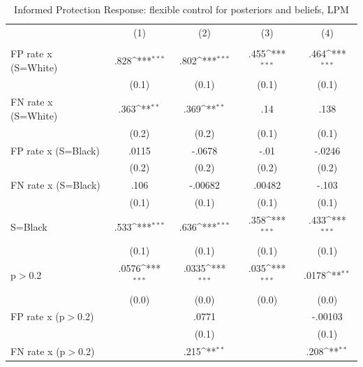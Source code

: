 \begin{table}[htbp]\centering
\def\sym#1{\ifmmode^{#1}\else\(^{#1}\)\fi}
\caption{Informed Protection Response: flexible control for posteriors and beliefs, LPM}
\begin{tabular}{l*{4}{c}}
\hline\hline
                &\multicolumn{1}{c}{(1)}&\multicolumn{1}{c}{(2)}&\multicolumn{1}{c}{(3)}&\multicolumn{1}{c}{(4)}\\
                &\multicolumn{1}{c}{}&\multicolumn{1}{c}{}&\multicolumn{1}{c}{}&\multicolumn{1}{c}{}\\
\hline
FP rate x (S=White)&     .828\sym{***}&     .802\sym{***}&     .455\sym{***}&     .464\sym{***}\\
                &    (0.1)         &    (0.1)         &    (0.1)         &    (0.1)         \\
FN rate x (S=White)&     .363\sym{**} &     .369\sym{**} &      .14         &     .138         \\
                &    (0.2)         &    (0.2)         &    (0.1)         &    (0.1)         \\
FP rate x (S=Black)&    .0115         &   -.0678         &     -.01         &   -.0246         \\
                &    (0.2)         &    (0.2)         &    (0.2)         &    (0.2)         \\
FN rate x (S=Black)&     .106         &  -.00682         &   .00482         &    -.103         \\
                &    (0.1)         &    (0.1)         &    (0.1)         &    (0.1)         \\
S=Black         &     .533\sym{***}&     .636\sym{***}&     .358\sym{***}&     .433\sym{***}\\
                &    (0.1)         &    (0.1)         &    (0.1)         &    (0.1)         \\
p$>$0.2         &    .0576\sym{***}&    .0335\sym{***}&     .035\sym{***}&    .0178\sym{**} \\
                &    (0.0)         &    (0.0)         &    (0.0)         &    (0.0)         \\
FP rate x (p$>$0.2)&                  &    .0771         &                  &  -.00103         \\
                &                  &    (0.1)         &                  &    (0.1)         \\
FN rate x (p$>$0.2)&                  &     .215\sym{**} &                  &     .208\sym{**} \\

\end{tabular}
\end{table}
